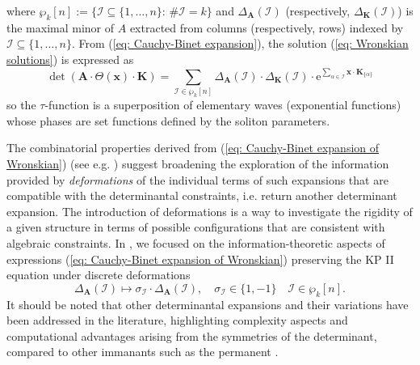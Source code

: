 \documentclass[10pt]{article}
\theoremstyle{remark}%
\theoremstyle{definition}%
\begin{document}
where $\wp_{k}[n]:=\{\mathcal{I}\subseteq \{1,\dots,n\}:\,\#\mathcal{I}=k\}$ and $\Delta_{\mathbf{A}}(\mathcal{I})$ (respectively, $\Delta_{\mathbf{K}}(\mathcal{I})$) is the maximal minor of $A$ extracted from columns (respectively, rows) indexed by $\mathcal{I}\subseteq\{1,\dots,n\}$. From (\ref{eq: Cauchy-Binet expansion}), the solution (\ref{eq: Wronskian solutions}) is expressed as  
 \begin{equation}
\det(\mathbf{A}\cdot{\ensuremath{\Theta}}(\mathbf{x})\cdot\mathbf{K})=\sum_{\mathcal{I}\in \wp_{k}[n]}\Delta_{\mathbf{A}}(\mathcal{I})\cdot\Delta_{\mathbf{K}}(\mathcal{I})\cdot\mathrm{e}^{\sum_{\alpha\in\mathcal{I}}\mathbf{x}\cdot\mathbf{K}_{\{\alpha\}}}
\label{eq: Cauchy-Binet expansion of Wronskian}
 \end{equation} 
so the $\tau$-function is a superposition of elementary waves (exponential functions) whose phases are set functions defined by the soliton parameters. 

The combinatorial properties derived from (\ref{eq: Cauchy-Binet expansion of Wronskian}) (see e.g. \cite{Kodama2017}) suggest broadening the exploration of the information provided by \emph{deformations} of the individual terms of such expansions that are compatible with the determinantal constraints, i.e. return another determinant expansion. The introduction of deformations is a way to investigate the rigidity of a given structure in terms of possible configurations that are consistent with algebraic constraints. In \citep{Angelelli2019}, we focused on the information-theoretic aspects of expressions (\ref{eq: Cauchy-Binet expansion of Wronskian}) preserving the KP II equation under discrete deformations 
 \begin{equation}
\Delta_{\mathbf{A}}(\mathcal{I})\mapsto\sigma_{\mathcal{I}}\cdot\Delta_{\mathbf{A}}(\mathcal{I}),\quad\sigma_{\mathcal{I}}\in\{1,-1\}\quad \mathcal{I}\in\wp_{k}[n].
\label{eq: sign of minor}
 \end{equation}
It should be noted that other determinantal expansions and their variations have been addressed in the literature, highlighting complexity aspects and computational advantages arising from the symmetries of the determinant, compared to other immanants such as the permanent \citep{Valiant1979}.
\end{document}

